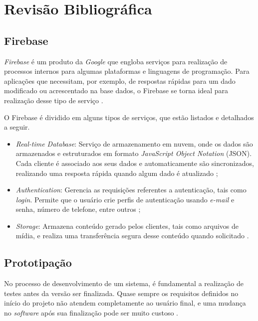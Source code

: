 \chapter{Revisão Bibliográfica}

\section{Firebase}

\textit{Firebase} é um produto da \textit{Google} que engloba serviços para realização de  processos internos para algumas plataformas e linguagens de programação. Para aplicações que necessitam, por exemplo, de respostas rápidas para um dado modificado ou acrescentado na base dados, o Firebase se torna ideal para realização desse tipo de serviço \cite{firebase}.

O Firebase é dividido em alguns tipos de serviços, que estão listados e detalhados a seguir.

\begin{itemize}
    \item \textit{Real-time Database}: Serviço de armazenamento em nuvem, onde os dados são armazenados e estruturados em formato \textit{JavaScript Object Notation} (JSON). Cada cliente é associado aos seus dados e automaticamente são sincronizados, realizando uma resposta rápida quando algum dado é atualizado \cite{firebase};
    \item \textit{Authentication}: Gerencia as requisições referentes a autenticação, tais como \textit{login}. Permite que o usuário crie perfis de autenticação usando \textit{e-mail} e senha, número de telefone, entre outros \cite{firebase};
    \item \textit{Storage}: Armazena conteúdo gerado pelos clientes, tais como arquivos de mídia, e realiza uma transferência segura desse conteúdo quando solicitado \cite{firebase}. 
\end{itemize}

\section{Prototipação}

No processo de desenvolvimento de um sistema, é fundamental a realização de testes antes da versão ser finalizada. Quase sempre os requisitos definidos no início do projeto não atendem completamente ao usuário final, e uma mudança no \textit{software} após sua finalização pode ser muito custoso \cite{prototipacao}.

